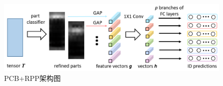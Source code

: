 \begin{figure}
\centering
\includegraphics[width=1\textwidth]{figure/structure2}
\caption{PCB+RPP架构图}
\label{fig:structure2}
\end{figure}